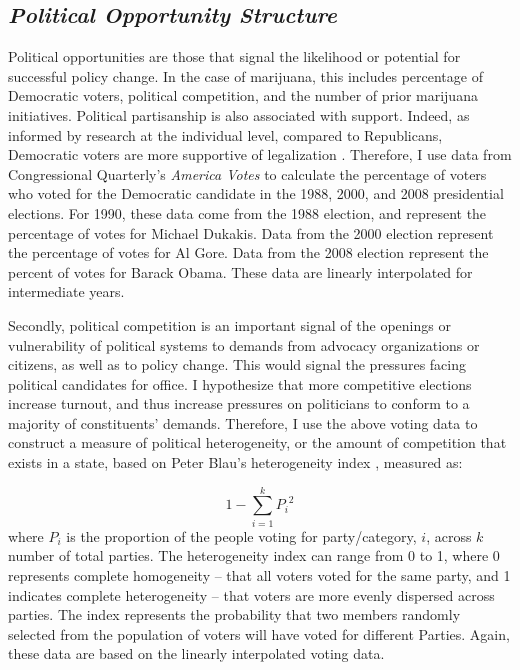 %

\subsection{\it{Political Opportunity Structure}}

Political opportunities are those that signal the likelihood or potential for successful policy change. In the case of marijuana, this includes percentage of Democratic voters, political competition, and the number of prior marijuana initiatives. Political partisanship is also associated with support. Indeed, as informed by research at the individual level, compared to Republicans, Democratic voters are more supportive of legalization \citep{rosenthal_and_kubby_1996,caulkins_et_al_2012}. Therefore, I use data from Congressional Quarterly's {\it{America Votes}} to calculate the percentage of voters who voted for the Democratic candidate in the 1988, 2000, and 2008 presidential elections. For 1990, these data come from the 1988 election, and represent the percentage of votes for Michael Dukakis. Data from the 2000 election represent the percentage of votes for Al Gore. Data from the 2008 election represent the percent of votes for Barack Obama. These data are linearly interpolated for intermediate years. 


Secondly, political competition is an important signal of the openings or vulnerability of political systems to demands from advocacy organizations or citizens, as well as to policy change. This would signal the pressures facing political candidates for office. I hypothesize that more competitive elections increase turnout, and thus increase pressures on politicians to conform to a majority of constituents' demands. Therefore, I use the above voting data to construct a measure of political heterogeneity, or the amount of competition that exists in a state, based on Peter Blau's heterogeneity index \citep{blau_1977a}, measured as:

\begin{equation}
1 - \sum_{i = 1}^{k}{P_{i}}^2
\end{equation}
where $P_{i}$ is the proportion of the people voting for party/category, $i$, across $k$ number of total parties. The heterogeneity index can range from 0 to 1, where 0 represents complete homogeneity -- that all voters voted for the same party, and 1 indicates complete heterogeneity -- that voters are more evenly dispersed across parties. The index represents the probability that two members randomly selected from the population of voters will have voted for different Parties. Again, these data are based on the linearly interpolated voting data.

